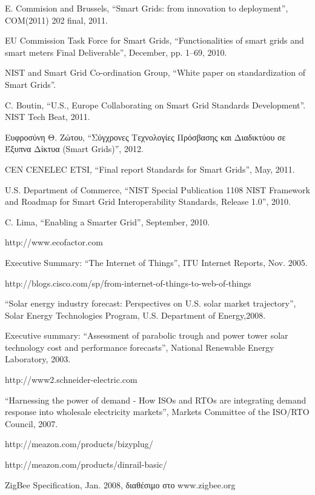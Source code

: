 \documentclass[12pt, a4paper, oneside]{report}
\begin{document}
\begin{thebibliography}{99}
E. Commision and Brussels, ``Smart Grids: from innovation to deployment'', COM(2011) 202 final, 2011.

EU Commission Task Force for Smart Grids, ``Functionalities of smart grids and smart meters Final Deliverable'', December, pp. 1–69, 2010.

NIST and Smart Grid Co-ordination Group, ``White paper on standardization of Smart Grids''.

C. Boutin, ``U.S., Europe Collaborating on Smart Grid Standards Development''. NIST Tech Beat, 2011.

Ευφροσύνη Θ. Ζώτου, ``Σύγχρονες Τεχνολογίες Πρόσβασης και Διαδικτύου σε Έξυπνα Δίκτυα (Smart Grids)'', 2012.

CEN CENELEC ETSI, ``Final report Standards for Smart Grids'', May, 2011.

U.S. Department of Commerce, ``NIST Special Publication 1108 NIST Framework and Roadmap for Smart Grid Interoperability Standards, Release 1.0'', 2010.

C. Lima, ``Enabling a Smarter Grid'', September, 2010.

http://www.ecofactor.com

Executive Summary: ``The Internet of Things'', ITU Internet Reports, Nov. 2005.

http://blogs.cisco.com/sp/from-internet-of-things-to-web-of-things


``Solar energy industry forecast: Perspectives on U.S. solar market trajectory'', Solar Energy Technologies Program, U.S. Department of Energy,2008.

Executive summary: ``Assessment of parabolic trough and power tower solar technology cost and performance forecasts'', National Renewable Energy Laboratory, 2003.

http://www2.schneider-electric.com

``Harnessing the power of demand - How ISOs and RTOs are integrating demand response into wholesale electricity markets'', Markets Committee of the ISO\slash RTO Council, 2007.

http://meazon.com/products/bizyplug/

http://meazon.com/products/dinrail-basic/

ZigBee Specif\mbox{}ication, Jan. 2008, διαθέσιμο στο www.zigbee.org


\end{thebibliography}
\end{document}
